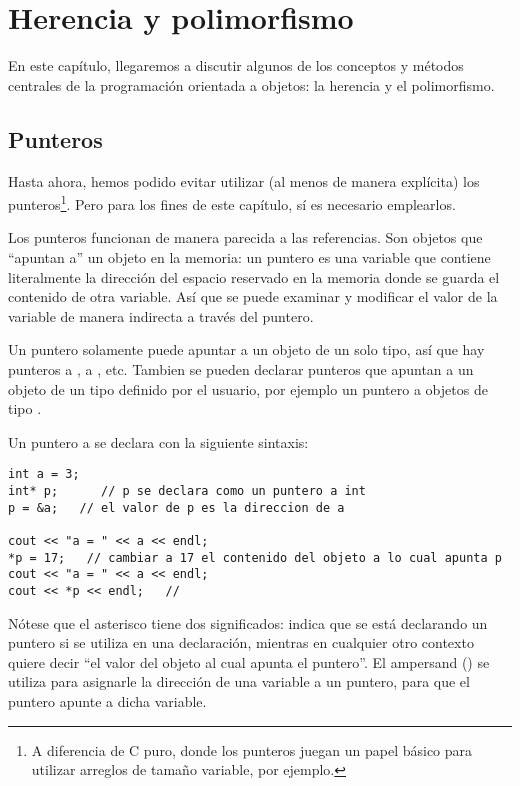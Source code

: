 \chapter{Herencia y polimorfismo}

En este capítulo, llegaremos a discutir algunos de los conceptos y métodos centrales de la programación orientada a objetos: la herencia y el polimorfismo.

\section{Punteros}

Hasta ahora, hemos podido evitar utilizar (al menos de manera explícita) los punteros\footnote{A diferencia de C puro, donde los punteros juegan un papel básico para utilizar arreglos de tamaño variable, por ejemplo.}. Pero para los fines de este capítulo, sí es necesario emplearlos.

Los punteros funcionan de manera parecida a las referencias. Son objetos que ``apuntan a'' un objeto en la memoria: un puntero es una variable que contiene literalmente la dirección del espacio reservado en la memoria donde se guarda el contenido de otra variable.
Así que se puede examinar y modificar el valor de la variable de manera indirecta a través del puntero.

Un puntero solamente puede apuntar a un objeto de un solo tipo, así que hay punteros a , a , etc.  Tambien se pueden declarar punteros que
apuntan a un objeto de un tipo definido por el usuario, por ejemplo un puntero a objetos de tipo .

Un puntero a  se declara con la siguiente sintaxis:
\begin{lstlisting}
int a = 3;
int* p;      // p se declara como un puntero a int
p = &a;   // el valor de p es la direccion de a

cout << "a = " << a << endl;
*p = 17;   // cambiar a 17 el contenido del objeto a lo cual apunta p
cout << "a = " << a << endl;
cout << *p << endl;   // 
\end{lstlisting}
Nótese que el asterisco tiene dos significados: indica que se está declarando un puntero si se utiliza en una declaración, mientras en cualquier otro contexto quiere decir ``el valor del objeto al cual apunta el puntero''. El ampersand (\inl{&}) se utiliza para asignarle la dirección de una variable a un puntero, para que el puntero apunte a dicha variable.

